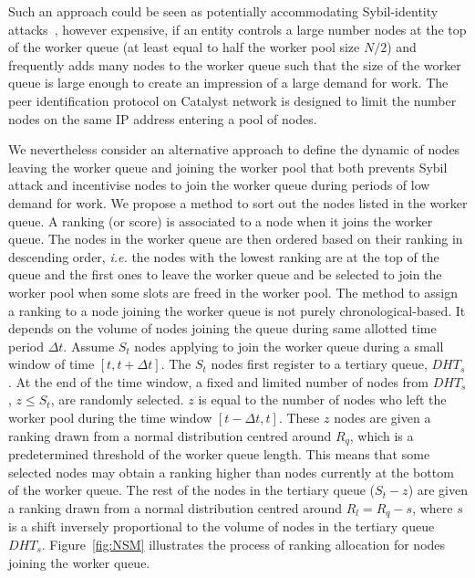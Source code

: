 Such an approach could be seen as potentially accommodating Sybil-identity attacks~\cite{sybil}, however expensive, if an entity controls a large number nodes at the top of the worker queue (at least equal to half the worker pool size $N/2$) and frequently adds many nodes to the worker queue such that the size of the worker queue is large enough to create an impression of a large demand for work. The peer identification protocol on Catalyst network is designed to limit the number nodes on the same IP address entering a pool of nodes. 

We nevertheless consider an alternative approach to define the dynamic of nodes leaving the worker queue and joining the worker pool that both prevents Sybil attack and incentivise nodes to join the worker queue during periods of low demand for work. We propose a method to sort out the nodes listed in the worker queue. A ranking (or score) is associated to a node when it joins the worker queue. The nodes in the worker queue are then ordered based on their ranking in descending order, \textit{i.e.} the nodes with the lowest ranking are at the top of the queue and the first ones to leave the worker queue and be selected to join the worker pool when some slots are freed in the worker pool. The method to assign a ranking to a node joining the worker queue is not purely chronological-based. It depends on the volume of nodes joining the queue during same allotted time period $\Delta t$. Assume $S_t$ nodes applying to join the worker queue during a small window of time $[t, t+\Delta t]$. The $S_t$ nodes first register to a tertiary queue, $DHT_s$. At the end of the time window, a fixed and limited number of nodes from $DHT_s$, $z \leq S_t$, are randomly selected. $z$ is equal to the number of nodes who left the worker pool during the time window  $[t-\Delta t, t]$. These $z$ nodes are given a ranking drawn from a normal distribution centred around $R_q$, which is a predetermined threshold of the worker queue length. This means that some selected nodes may obtain a ranking higher than nodes currently at the bottom of the worker queue. The rest of the nodes in the tertiary queue ($S_t-z$) are given a ranking drawn from a normal distribution centred around $R_l = R_q - s$, where $s$ is a shift inversely proportional to the volume of nodes in the tertiary queue $DHT_s$. Figure~\ref{fig:NSM} illustrates the process of ranking allocation for nodes joining the worker queue. \\

